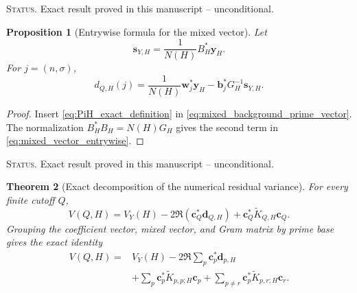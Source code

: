 \documentclass[11pt]{amsart}
\numberwithin{equation}{section}
\theoremstyle{plain}
\newtheorem{theorem}{Theorem}[section]
\newtheorem{proposition}[theorem]{Proposition}
\theoremstyle{definition}
\theoremstyle{remark}
\newcommand{\1}{\mathbf{1}}
\newcommand{\statusnote}[1]{%
  \par\smallskip\noindent
  \begingroup\footnotesize\textsc{Status.} #1\endgroup
  \par\smallskip}
\begin{document}
\statusnote{Exact result proved in this manuscript -- unconditional.}
\begin{proposition}[Entrywise formula for the mixed vector]
\label{prop:mixed_vector_entrywise}
Let
\begin{equation}
\mathbf s_{Y,H}
=
\frac1{N(H)}B_H^\ast\mathbf y_H.
\label{eq:background_removed_coordinates}
\end{equation}
For $j=(n,\sigma)$,
\begin{equation}
\boxed{
 d_{Q,H}(j)
=
\frac1{N(H)}\mathbf w_j^\ast\mathbf y_H
-
\mathbf b_j^\ast G_H^{-1}\mathbf s_{Y,H}.
}
\label{eq:mixed_vector_entrywise}
\end{equation}
\end{proposition}

\begin{proof}
Insert \eqref{eq:PiH_exact_definition} in
\eqref{eq:mixed_background_prime_vector}.  The normalization
$B_H^\ast B_H=N(H)G_H$ gives the second term in
\eqref{eq:mixed_vector_entrywise}.
\end{proof}

\statusnote{Exact result proved in this manuscript -- unconditional.}
\begin{theorem}[Exact decomposition of the numerical residual variance]
\label{thm:exact_system_variance}
For every finite cutoff $Q$,
\begin{equation}
\boxed{
V(Q,H)
=
V_Y(H)
-
2\Re\left(\mathbf c_Q^\ast\mathbf d_{Q,H}\right)
+
\mathbf c_Q^\ast\widetilde K_{Q,H}\mathbf c_Q.
}
\label{eq:exact_residual_variance}
\end{equation}
Grouping the coefficient vector, mixed vector, and Gram matrix by prime
base gives the exact identity
\begin{align}
V(Q,H)
={}&
V_Y(H)
-
2\Re\sum_p\mathbf c_p^\ast\mathbf d_{p,H}
\label{eq:tower_variance_background_mixed}
\\
&+
\sum_p
\mathbf c_p^\ast\widetilde K_{p,p;H}\mathbf c_p
+
\sum_{p\neq r}
\mathbf c_p^\ast\widetilde K_{p,r;H}\mathbf c_r.
\label{eq:tower_variance_decomposition}
\end{align}
\end{theorem}
\end{document}
